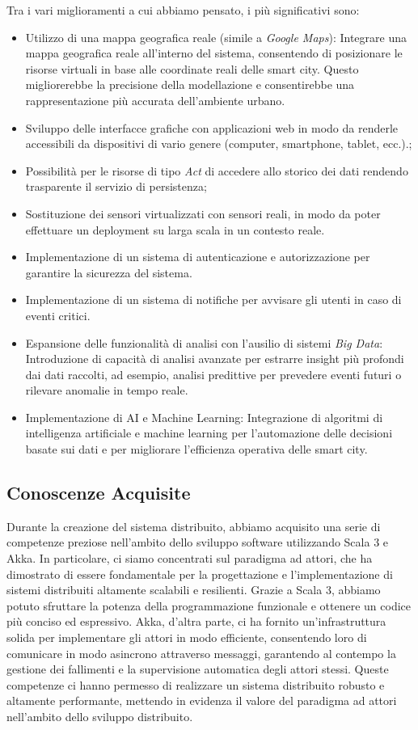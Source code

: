\documentclass{scrartcl}
\begin{document}
Tra i vari miglioramenti a cui abbiamo pensato, i più significativi sono:
\begin{itemize}
    \item Utilizzo di una mappa geografica reale (simile a \textit{Google Maps}): Integrare una mappa geografica reale all'interno del sistema, consentendo di posizionare le risorse virtuali in base alle coordinate reali delle smart city. Questo migliorerebbe la precisione della modellazione e consentirebbe una rappresentazione più accurata dell'ambiente urbano.
    \item Sviluppo delle interfacce grafiche con applicazioni web in modo da renderle accessibili da dispositivi di vario genere (computer, smartphone, tablet, ecc.).;
    \item Possibilità per le risorse di tipo \textit{Act} di accedere allo storico dei dati rendendo trasparente il servizio di persistenza;
    \item Sostituzione dei sensori virtualizzati con sensori reali, in modo da poter effettuare un deployment su larga scala in un contesto reale.
    \item Implementazione di un sistema di autenticazione e autorizzazione per garantire la sicurezza del sistema.
    \item Implementazione di un sistema di notifiche per avvisare gli utenti in caso di eventi critici.
    \item Espansione delle funzionalità di analisi con l'ausilio di sistemi \textit{Big Data}: Introduzione di capacità di analisi avanzate per estrarre insight più profondi dai dati raccolti, ad esempio, analisi predittive per prevedere eventi futuri o rilevare anomalie in tempo reale.
    \item Implementazione di AI e Machine Learning: Integrazione di algoritmi di intelligenza artificiale e machine learning per l'automazione delle decisioni basate sui dati e per migliorare l'efficienza operativa delle smart city.
\end{itemize}

\subsection{Conoscenze Acquisite}

Durante la creazione del sistema distribuito, abbiamo acquisito una serie di competenze preziose nell'ambito dello sviluppo software utilizzando Scala 3 e Akka. In particolare, ci siamo concentrati sul paradigma ad attori, che ha dimostrato di essere fondamentale per la progettazione e l'implementazione di sistemi distribuiti altamente scalabili e resilienti. Grazie a Scala 3, abbiamo potuto sfruttare la potenza della programmazione funzionale e ottenere un codice più conciso ed espressivo. Akka, d'altra parte, ci ha fornito un'infrastruttura solida per implementare gli attori in modo efficiente, consentendo loro di comunicare in modo asincrono attraverso messaggi, garantendo al contempo la gestione dei fallimenti e la supervisione automatica degli attori stessi. Queste competenze ci hanno permesso di realizzare un sistema distribuito robusto e altamente performante, mettendo in evidenza il valore del paradigma ad attori nell'ambito dello sviluppo distribuito.

\newpage

\nocite{*} %


\end{document}
